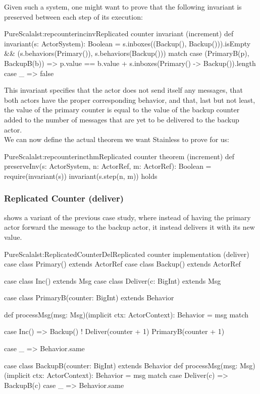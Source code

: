 Given such a system, one might want to prove that the following invariant is 
preserved between each step of its execution:

\begin{Code}{PureScala}{lst:repcounterincinv}{Replicated counter invariant (increment)}
def invariant(s: ActorSystem): Boolean = {
  s.inboxes((Backup(), Backup())).isEmpty && {
    (s.behaviors(Primary()), s.behaviors(Backup())) match {
      case (PrimaryB(p), BackupB(b)) =>
        p.value == b.value + s.inboxes(Primary() -> Backup()).length
      case _ => false
    }
  }
}
\end{Code}

This invariant specifies that the  actor does not send itself any messages, that both actors have the proper corresponding behavior, and that, last but not least, the value of the primary counter is equal to the value of the backup counter added to the number of messages that are yet to be delivered to the backup actor.\\

We can now define the actual theorem we want Stainless to prove for us:

\begin{Code}{PureScala}{lst:repcounterincthm}{Replicated counter theorem (increment)}
def preserveInv(s: ActorSystem, n: ActorRef, m: ActorRef): Boolean = {
  require(invariant(s))
  invariant(s.step(n, m))
} holds
\end{Code}


\subsubsection*{Replicated Counter (deliver)}

 shows a variant of the previous case study, where instead of having the primary actor forward the  message to the backup actor, it instead delivers it with its new value.

\begin{Code}{PureScala}{lst:ReplicatedCounterDel}{Replicated counter implementation (deliver)}
case class Primary() extends ActorRef
case class Backup()  extends ActorRef

case class Inc() extends Msg
case class Deliver(c: BigInt) extends Msg

case class PrimaryB(counter: BigInt) extends Behavior {
  def processMsg(msg: Msg)(implicit ctx: ActorContext): Behavior = msg match {
    case Inc() =>
      Backup() ! Deliver(counter + 1)
      PrimaryB(counter + 1)

    case _ => Behavior.same
  }
}

case class BackupB(counter: BigInt) extends Behavior {
  def processMsg(msg: Msg)(implicit ctx: ActorContext): Behavior = msg match {
    case Deliver(c) => BackupB(c)
    case _          => Behavior.same
  }
}
\end{Code}

